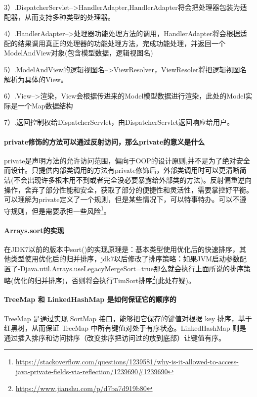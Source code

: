 \documentclass[../../../interview-questions.tex]{subfiles}
\begin{document}
3）.DispatcherServlet-->HandlerAdapter,HandlerAdapter将会把处理器包装为适配器，从而支持多种类型的处理器。

4）.HandlerAdapter-->处理器功能处理方法的调用，HandlerAdapter将会根据适配的结果调用真正的处理器的功能处理方法，完成功能处理，并返回一个ModelAndView对象(包含模型数据，逻辑视图名)

5）.ModelAndView的逻辑视图名-->ViewResolver，ViewResoler将把逻辑视图名解析为具体的View。

6）.View-->渲染，View会根据传进来的Model模型数据进行渲染，此处的Model实际是一个Map数据结构

7）.返回控制权给DispatcherServlet，由DispatcherServlet返回响应给用户。



\paragraph{private修饰的方法可以通过反射访问，那么private的意义是什么}

private是声明方法的允许访问范围，偏向于OOP的设计原则,并不是为了绝对安全而设计。只提供内部类调用的方法有private修饰后，外部类调用时可以更清晰简洁(不会出现许多根本用不到或者完全没必要暴露给外部类的方法)。反射偏重逆向操作，舍弃了部分性能和安全，获取了部分的便捷性和灵活性，需要掌控好平衡。可以理解为private定义了一个规则，但是某些情况下，可以特事特办。可以不遵守规则，但是需要承担一些风险\footnote{\url{https://stackoverflow.com/questions/1239581/why-is-it-allowed-to-access-java-private-fields-via-reflection/1239690\#1239690}}。


\paragraph{Arrays.sort的实现}

在JDK7以前的版本中sort()的实现原理是：基本类型使用优化后的快速排序，其他类型使用优化后的归并排序，jdk7以后修改了排序策略：如果JVM启动参数配置了-Djava.util.Arrays.useLegacyMergeSort=true那么就会执行上面所说的排序策略(优化的归并排序)，否则将会执行TimSort排序\footnote{\url{https://www.jianshu.com/p/d7ba7d919b80}}(此处存疑)。

\paragraph{TreeMap 和 LinkedHashMap 是如何保证它的顺序的}

TreeMap 是通过实现 SortMap 接口，能够把它保存的键值对根据 key 排序，基于红黑树，从而保证 TreeMap 中所有键值对处于有序状态。LinkedHashMap 则是通过插入排序和访问排序（改变排序把访问过的放到底部）让键值有序。
\end{document}
